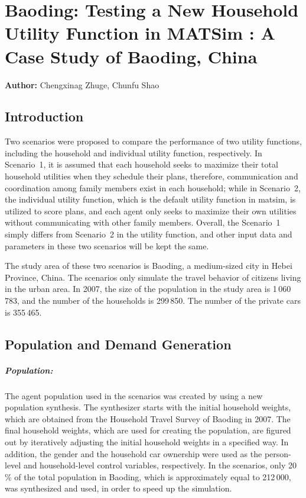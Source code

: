 \chapter{Baoding: Testing a New Household Utility Function in MATSim : A Case Study of Baoding, China}
\label{ch:baoding}
\hfill \textbf{Author:} Chengxinag Zhuge, Chunfu Shao


\section{Introduction}
Two scenarios were proposed to compare the performance of two utility functions, including the household and individual utility function, respectively. 
In Scenario~1, it is assumed that each household seeks to maximize their total household utilities when they schedule their plans, therefore, communication and coordination among family members exist in each household; while in Scenario~2, the individual utility function, which is the default utility function in \gls{matsim}, is utilized to score plans, and each agent only seeks to maximize their own utilities without communicating with other family members. 
Overall, the Scenario~1 simply differs from Scenario~2 in the utility function, and other input data and parameters in these two scenarios will be kept the same. 

The study area of these two scenarios is Baoding, a medium-sized city in Hebei Province, China. 
The scenarios only simulate the travel behavior of citizens living in the urban area. 
In 2007, the size of the population in the study area is 1\,060\,783, and the number of the households is 299\,850.  
The number of the private cars is 355\,465. 

\section{Population and Demand Generation}
\paragraph{Population:} The agent population used in the scenarios was created by using a new population synthesis. 
The synthesizer starts with the initial household weights, which are obtained from the Household Travel Survey of Baoding in 2007. 
The final household weights, which are used for creating the population, are figured out by iteratively adjusting the initial household weights in a specified way. 
In addition, the gender and the household car ownership were used as the person-level and household-level control variables, respectively. 
In the scenarios, only 20\,\% of the total population in Baoding, which is approximately equal to 212\,000, was synthesized and used, in order to speed up the simulation. 

